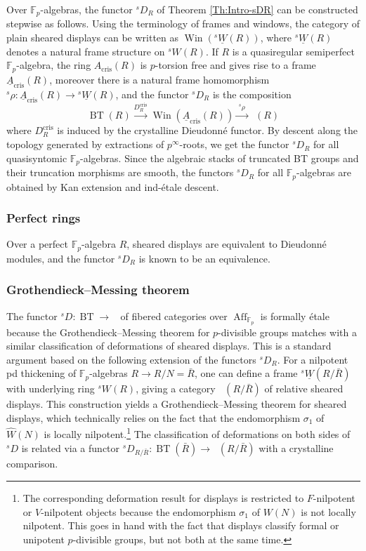 \documentclass[a4paper,11pt]{amsart}
\theoremstyle{plain}
\theoremstyle{definition}
\theoremstyle{remark}
\renewcommand{\u}{\underline}
\numberwithin{equation}{section}
\newcommand{\FF}{{\mathbb{F}}}
\DeclareMathOperator{\crys}{cris}
\DeclareMathOperator{\Aff}{Aff}
\DeclareMathOperator{\BT}{BT}
\DeclareMathOperator{\sDisp}{{}^sDisp}
\DeclareMathOperator{\Win}{Win}
\newcommand{\sD}{{}^{s\!}D}
\newcommand{\sW}{{}^sW}
\newcommand{\usW}{{}^s\u W}
\newcommand{\srho}{{}^{s\!}\rho}
\begin{document}
Over $\FF_p$-algebras, the functor $\sD_R$ of Theorem \ref{Th:Intro-sDR} can be constructed stepwise as follows.
Using the terminology of frames and windows, the category of plain sheared displays can be written as $\Win(\usW(R))$, where $\usW(R)$ denotes a natural frame structure on $\sW(R)$.
If $R$ is a quasiregular semiperfect $\FF_p$-algebra, 
the ring $A_{\crys}(R)$ is $p$-torsion free and gives rise to a frame $\u A_{\crys}(R)$, moreover
there is a natural frame homomorphism $\srho\colon\u A_{\crys}(R)\to\usW(R)$, and the functor $\sD_R$ is the composition
\[
\BT(R)\xrightarrow{D_R^{\crys}}\Win(\u A_{\crys}(R))\xrightarrow{\;\srho\;}\sDisp(R)
\]
where $D_R^{\crys}$ is induced by the crystalline Dieudonn\'e functor.
By descent along the topology generated by extractions of $p^{\infty}$-roots, we get the functor $\sD_R$ for all quasisyntomic $\FF_p$-algebras. 
Since the algebraic stacks of truncated BT groups and their truncation morphisms are smooth, the functors $\sD_R$ for all $\FF_p$-algebras are obtained by Kan extension and ind-\'etale descent.

\subsubsection*{Perfect rings}

Over a perfect $\FF_p$-algebra $R$, sheared displays are equivalent to Dieudonn\'e modules, and the functor $\sD_R$ is known to be an equivalence.

\subsubsection*{Grothendieck--Messing theorem}

The functor $\sD\colon\BT\to\sDisp$ of fibered categories over $\Aff_{\FF_p}$ is formally \'etale because the Grothendieck--Messing theorem for $p$-divisible groups matches with a similar classification of deformations of sheared displays. This is a standard argument based on the following extension of the functors $\sD_R$.
For a nilpotent pd thickening of $\FF_p$-algebras $R\to R/N=\bar R$, one can define a frame $\usW(R/\bar R)$ with underlying ring $\sW(R)$, giving a category $\sDisp(R/\bar R)$  of relative sheared displays. This construction yields a Grothendieck--Messing theorem for sheared displays, which technically relies on the fact that the endomorphism $\sigma_1$ of $\hat W(N)$ is locally nilpotent.\footnote{The corresponding deformation result for displays is restricted to $F$-nilpotent or $V$-nilpotent objects because the endomorphism $\sigma_1$ of $W(N)$ is not locally nilpotent. This goes in hand with the fact that displays classify formal or unipotent $p$-divisible groups, but not both at the same time.}
The classification of deformations on both sides of $\sD$ is related via a functor $\sD_{R/\bar R}\colon\BT(\bar R)\to\sDisp(R/\bar R)$ with a crystalline comparison.
\end{document}
